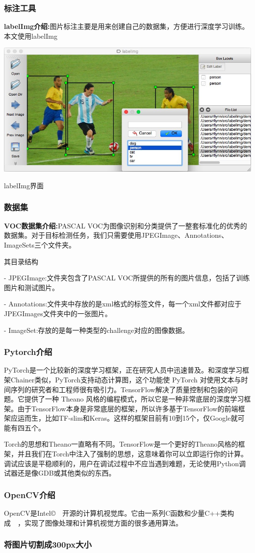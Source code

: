 \subsubsection{标注工具}
\textbf{labelImg介绍:}图片标注主要是用来创建自己的数据集，方便进行深度学习训练。本文使用labelImg
\begin{uscfigure}
	\includegraphics[width=\textwidth]{./Pictures/labelimg.jpg}	
	\caption{labelImg界面}
\end{uscfigure}
\subsubsection{数据集}
\textbf{VOC数据集介绍:}PASCAL VOC为图像识别和分类提供了一整套标准化的优秀的数据集。对于目标检测任务，我们只需要使用JPEGImage、Annotations、ImageSets三个文件夹。

其目录结构

- JPEGImage:文件夹包含了PASCAL VOC所提供的所有的图片信息，包括了训练图片和测试图片。

- Annotations:文件夹中存放的是xml格式的标签文件，每一个xml文件都对应于JPEGImages文件夹中的一张图片。

- ImageSet:存放的是每一种类型的challenge对应的图像数据。


\subsubsection{Pytorch介绍}
PyTorch是一个比较新的深度学习框架，正在研究人员中迅速普及。和深度学习框架Chainer类似，PyTorch支持动态计算图，这个功能使 PyTorch 对使用文本与时间序列的研究者和工程师很有吸引力。TensorFlow解决了质量控制和包装的问题。它提供了一种 Theano 风格的编程模式，所以它是一种非常底层的深度学习框架。由于TensorFlow本身是非常底层的框架，所以许多基于TensorFlow的前端框架应运而生，比如TF-slim和Keras。这样的框架目前有10到15个，仅Google就可能有四五个。

Torch的思想和Theano一直略有不同。TensorFlow是一个更好的Theano风格的框架，并且我们在Torch中注入了强制的思想，这意味着你可以立即运行你的计算。调试应该是平稳顺利的，用户在调试过程中不应当遇到难题，无论使用Python调试器还是像GDB或其他类似的东西。
\subsubsection{OpenCV介绍}
OpenCV是Intel\copyright　开源的计算机视觉库。它由一系列C函数和少量C++类构成　，实现了图像处理和计算机视觉方面的很多通用算法。
\subsubsection{将图片切割成300px大小}
\begin{lstlisting}[caption={图像切割}]

\end{lstlisting}